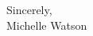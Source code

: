 \documentclass[]{watson-cv}
\begin{document}
\begin{minipage}[t]{0.8\textwidth}
Sincerely,\\
Michelle Watson\\
\\
\end{minipage}

%
%
\end{document}
